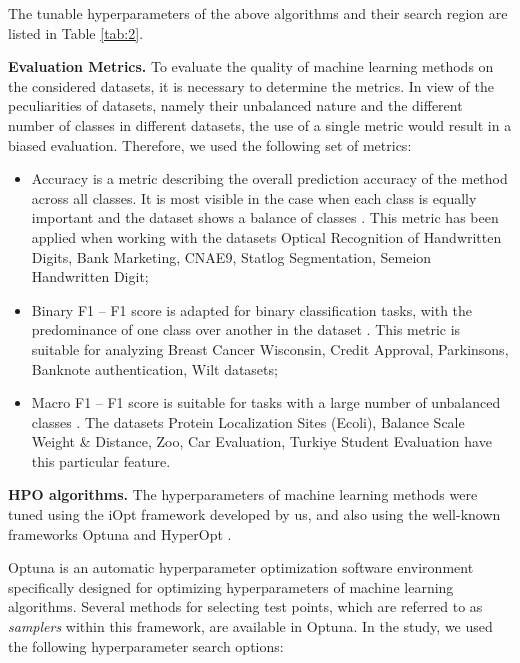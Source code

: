 \documentclass[iicol]{sn-jnl}
\theoremstyle{thmstyleone}%
\theoremstyle{thmstyletwo}%
\theoremstyle{thmstylethree}%
\begin{document}
The tunable hyperparameters of the above algorithms and their search region are listed in Table \ref{tab:2}.

\textbf{Evaluation Metrics.} To evaluate the quality of machine learning methods on the considered datasets, it is necessary to determine the metrics. In view of the peculiarities of datasets, namely their unbalanced nature and the different number of classes in different datasets, the use of a single metric would result in a biased evaluation. Therefore, we used the following set of metrics:
\begin{itemize}
\item Accuracy is a metric describing the overall prediction accuracy of the method across all classes. It is most visible in the case when each class is equally important and the dataset shows a balance of classes \citep{Metric1}. This metric has been applied when working with the datasets Optical Recognition of Handwritten Digits, Bank Marketing, CNAE9, Statlog Segmentation, Semeion Handwritten Digit;
\item Binary F1 -- F1 score is adapted for binary classification tasks, with the predominance of one class over another in the dataset \citep{Chicco2020}. This metric is suitable for analyzing Breast Cancer Wisconsin, Credit Approval, Parkinsons, Banknote authentication, Wilt datasets; 
\item Macro F1 -- F1 score is suitable for tasks with a large number of unbalanced classes \citep{Metric2}. The datasets Protein Localization Sites (Ecoli), Balance Scale Weight \& Distance, Zoo, Car Evaluation, Turkiye Student Evaluation have this particular feature.
\end{itemize}

\textbf{HPO algorithms.} The hyperparameters of machine learning methods were tuned using the iOpt framework developed by us, and also using the well-known frameworks Optuna \citep{optuna} and HyperOpt \citep{hyperopt}.

Optuna is an automatic hyperparameter optimization software environment specifically designed for optimizing hyperparameters of machine learning algorithms. Several methods for selecting test points, which are referred to as \textit{samplers} within this framework, are available in Optuna.  In the study, we used the following hyperparameter search options:
\end{document}
